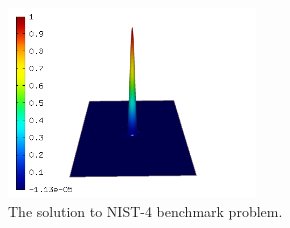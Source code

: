 \documentclass[12pt]{elsarticle}
\begin{document}
\begin{figure}[H]
\centering
\includegraphics[height=5cm]{nist/nist-4/solution.png}
\caption{The solution to NIST-4 benchmark problem.}
\vspace{-3mm}
\label{fig:sln-nist04}
\end{figure}

\end{document}
